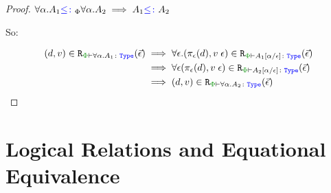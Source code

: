 \begin{framed}
\begin{proof}
    \case{\squant}
    $\forall \alpha. A_1{\color{blue} \leq\colon}_\Phi \forall \alpha. A_2\implies A_1{\color{blue} \leq\colon} A_2$
    
    So:
    
    \begin{align*}
        \inLogRelPE{d}{v}{\all{\a}{A_1}} & \implies \forall \e.\inLogRelPE{\pe(d)}{\eapp{v}{\e}}{A_1\ssub{\e}{\a}}\\
        & \implies \forall\e \inLogRelPE{\pe(d)}{\eapp{v}{\e}}{A_2\ssub{\e}{\a}}\\
        & \implies \inLogRelPE{d}{v}{\all{\a}{A_2}}
    \end{align*}
    \end{proof}
    
\end{framed}


\section{Logical Relations and Equational Equivalence}
\label{AdequacyEqEquivProof}

